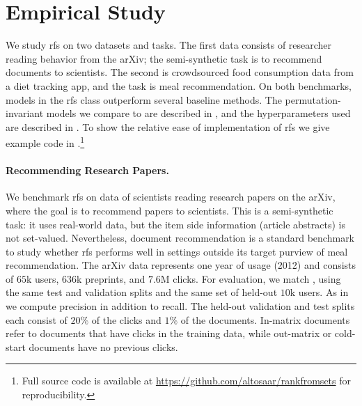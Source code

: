 \section{Empirical Study}
\label{sec:rfs-experiments}
We study \gls{rfs} on two datasets and tasks. The first data consists of researcher reading behavior from the arXiv; the semi-synthetic task is to recommend documents to scientists. The second is crowdsourced food consumption data from a diet tracking app, and the task is meal recommendation. On both benchmarks, models in the \gls{rfs} class outperform several baseline methods. The permutation-invariant models we compare to are described in , and the hyperparameters used are described in . To show the relative ease of implementation of \gls{rfs} we give example code in .\footnote{Full source code is available at \url{https://github.com/altosaar/rankfromsets} for reproducibility.}

\paragraph{Recommending Research Papers.} We benchmark \gls{rfs} on data of scientists reading research papers on the arXiv, where the goal is to recommend papers to scientists. This is a semi-synthetic task: it uses real-world data, but the item side information (article abstracts) is not set-valued. Nevertheless, document recommendation is a standard benchmark to study whether \gls{rfs} performs well in settings outside its target purview of meal recommendation. The arXiv data represents one year of usage (2012) and consists of $65$k users, $636$k preprints, and $7.6$M clicks. For evaluation, we match \citep{gopalan2014content-based}, using the same test and validation splits and the same set of held-out $10$k users. As in~ \citep{gopalan2014content-based} we compute precision in addition to recall. The held-out validation and test splits each consist of $20\%$ of the clicks and $1\%$ of the documents. In-matrix documents refer to documents that have clicks in the training data, while out-matrix or cold-start documents have no previous clicks.


